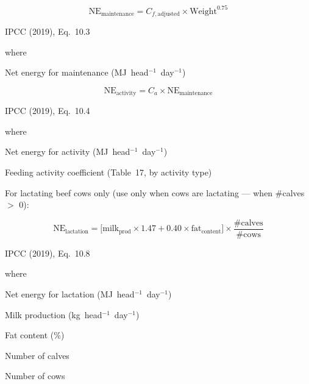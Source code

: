 \begin{equation}
    \mathrm{NE}_{\mathrm{maintenance}} =
        C_{f,\mathrm{adjusted}} \times \mathrm{Weight}^{0.75}
    \tag{Eq.\ 3.1.1.3}
\end{equation}

\noindent IPCC (2019), Eq.~10.3

\noindent where
\begin{description}[font=\normalfont, leftmargin=9em, style=sameline, nosep]
    \item[$\mathrm{NE}_{\mathrm{maintenance}}$] Net energy for maintenance
          (MJ~head$^{-1}$~day$^{-1}$)
\end{description}

\begin{equation}
    \mathrm{NE}_{\mathrm{activity}} = C_a \times \mathrm{NE}_{\mathrm{maintenance}}
    \tag{Eq.\ 3.1.1.4}
\end{equation}

\noindent IPCC (2019), Eq.~10.4

\noindent where
\begin{description}[font=\normalfont, leftmargin=9em, style=sameline, nosep]
    \item[$\mathrm{NE}_{\mathrm{activity}}$] Net energy for activity
          (MJ~head$^{-1}$~day$^{-1}$)
    \item[$C_a$] Feeding activity coefficient (Table~17, by activity type)
\end{description}

\noindent For lactating beef cows only (use only when cows are lactating ---
when \#calves $>$ 0):

\begin{equation}
    \mathrm{NE}_{\mathrm{lactation}} =
        \bigl[\mathrm{milk}_{\mathrm{prod}} \times 1.47
            + 0.40 \times \mathrm{fat}_{\mathrm{content}}\bigr]
        \times \frac{\#\mathrm{calves}}{\#\mathrm{cows}}
    \tag{Eq.\ 3.1.1.5}
\end{equation}

\noindent IPCC (2019), Eq.~10.8

\noindent where
\begin{description}[font=\normalfont, leftmargin=9em, style=sameline, nosep]
    \item[$\mathrm{NE}_{\mathrm{lactation}}$] Net energy for lactation
          (MJ~head$^{-1}$~day$^{-1}$)
    \item[$\mathrm{milk}_{\mathrm{prod}}$] Milk production (kg~head$^{-1}$~day$^{-1}$)
    \item[$\mathrm{fat}_{\mathrm{content}}$] Fat content (\%)
    \item[$\#\mathrm{calves}$] Number of calves
    \item[$\#\mathrm{cows}$] Number of cows
\end{description}


